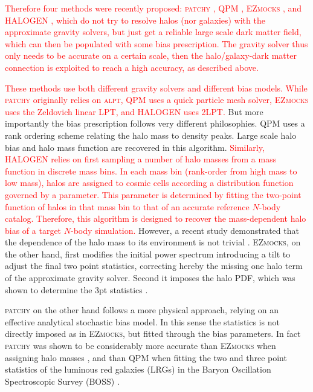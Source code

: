 \documentclass[english,usenatbib]{mn2e}
\newcommand{\tod}[1]{{\textcolor{red}{ #1}}}
\begin{document}
\tod{Therefore four methods were recently proposed: \textsc{patchy} \citep{kitaura2014}, \textsc{QPM} \citep{qpm}, \textsc{EZmocks} \citep{eazymock}, and \textsc{HALOGEN} \citep{halogen}, which do not try to resolve halos (nor galaxies) with the approximate gravity solvers, but just get a reliable large scale dark matter field, which can then be populated with some bias prescription. The gravity solver thus only needs to be accurate on a certain scale, then the halo/galaxy-dark matter connection is exploited to reach a high accuracy, as described above.}

\tod{These methods use both different gravity solvers and different bias models. While \textsc{patchy} originally relies on \textsc{alpt}, \textsc{QPM} uses a quick particle mesh solver, \textsc{EZmocks} uses the Zeldovich linear LPT, and \textsc{HALOGEN} uses 2LPT.}
But more importantly the bias prescription follows very different philosophies. \textsc{QPM} uses a rank ordering scheme relating the halo mass to density peaks. Large scale halo bias and halo mass function are recovered in this algorithm. \tod{Similarly, \textsc{HALOGEN} relies on first sampling a number of halo masses from a mass function in discrete mass bins. In each mass bin (rank-order from high mass to low mass), halos are assigned to cosmic cells according a distribution function governed by a parameter. This parameter is determined by fitting the two-point function of halos in that mass bin to that of an accurate reference $N$-body catalog. Therefore, this algorithm is designed to recover the mass-dependent halo bias of a target $N$-body simulation.}
However, a recent study  demonstrated  that the dependence of the halo mass to its environment is not trivial \citep[see][]{zhao2015}.  \textsc{EZmocks}, on the other hand, first modifies the initial power spectrum introducing a tilt to adjust the final two point statistics, correcting hereby the missing one halo term of the approximate gravity solver. Second it imposes the halo PDF, which was shown to determine the 3pt statistics \citep{kitaura2015}.

\textsc{patchy} on the other hand follows a more physical approach, relying on an effective analytical stochastic bias model. 
In this sense the statistics is not directly imposed as in \textsc{EZmocks}, but fitted through the bias parameters. In fact \textsc{patchy} was shown to be considerably more accurate than \textsc{EZmocks} when assigning halo masses \citep{zhao2015}, and than \textsc{QPM} when fitting the two and three point statistics of the luminous red galaxies (LRGs) in the Baryon Oscillation Spectroscopic Survey (BOSS)  \citep{kitaura2016}. 
\end{document}
